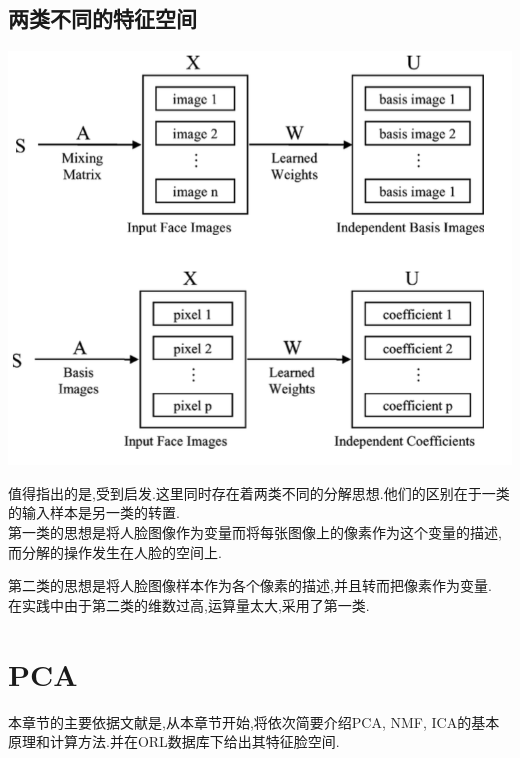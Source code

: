 \subsection{两类不同的特征空间}
\begin{center}
\begin{minipage}[t]{\linewidth}
\center
{
\includegraphics[scale=1]{Img/ica_c1c2.png} 
}
\end{minipage}
\medskip
\end{center}
值得指出的是,受到\cite{draper2003recognizing}启发.这里同时存在着两类不同的分解思想.他们的区别在于一类的输入样本是另一类的转置.\\



第一类的思想是将人脸图像作为变量而将每张图像上的像素作为这个变量的描述,而分解的操作发生在人脸的空间上.


第二类的思想是将人脸图像样本作为各个像素的描述,并且转而把像素作为变量.
\\
在实践中由于第二类的维数过高,运算量太大,采用了第一类.
\section{PCA}
本章节的主要依据文献是\cite{turk1991eigenfaces, turk1991face},从本章节开始,将依次简要介绍PCA, NMF, ICA的基本原理和计算方法.并在ORL数据库下给出其特征脸空间. \newline

